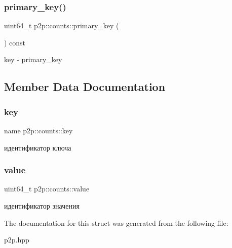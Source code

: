 \subsubsection{\texorpdfstring{primary\+\_\+key()}{primary\_key()}}
{\footnotesize\ttfamily uint64\+\_\+t p2p\+::counts\+::primary\+\_\+key (\begin{DoxyParamCaption}{ }\end{DoxyParamCaption}) const\hspace{0.3cm}{\ttfamily [inline]}}

key -\/ primary\+\_\+key 

\subsection{Member Data Documentation}
\mbox{\label{structp2p_1_1counts_a020c8e7885212e936588e4bed5acb2d6}} 
\subsubsection{\texorpdfstring{key}{key}}
{\footnotesize\ttfamily name p2p\+::counts\+::key}

идентификатор ключа \mbox{\label{structp2p_1_1counts_ababe8a6132ad10bc973c664c6a062749}} 
\subsubsection{\texorpdfstring{value}{value}}
{\footnotesize\ttfamily uint64\+\_\+t p2p\+::counts\+::value}

идентификатор значения 

The documentation for this struct was generated from the following file\+:\begin{DoxyCompactItemize}
\item 
p2p.\+hpp\end{DoxyCompactItemize}
